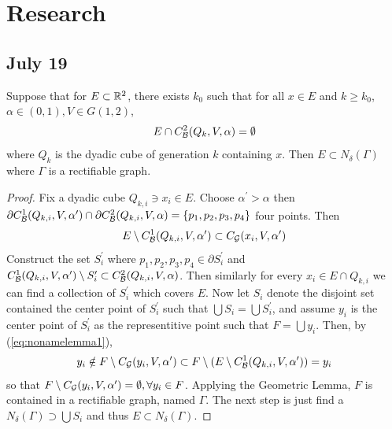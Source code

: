 \section{Research}


\subsection{July 19}
\begin{lemma}
    Suppose that for $E\subset \mathbb{R}^2$, there exists $k_0$ such that for all $x\in E$ and $k\geq k_0$, $\alpha\in(0,1), V\in G(1,2)$,
    \begin{equation*}
        E\cap C_\mathcal B^2(Q_k, V, \alpha) = \emptyset
    \end{equation*}
    where $Q_k$ is the dyadic cube of generation $k$ containing $x$. Then $E\subset N_\delta(\Gamma)$ where $\Gamma$ is a rectifiable graph. 
\end{lemma}
\begin{proof}
    Fix a dyadic cube $Q_{k,i}\ni x_i\in E$. Choose $\alpha^\prime>\alpha$ then $\partial C_\mathcal B^1(Q_{k,i}, V, \alpha^\prime) \cap \partial C_\mathcal B^2(Q_{k,i}, V, \alpha) = \{p_1, p_2, p_3, p_4\}$ four points. Then 
    \begin{equation}\label{eq:nonamelemma1}
        E\setminus C_\mathcal B^1(Q_{k,i}, V, \alpha^\prime)\subset C_\mathcal G(x_i, V, \alpha^\prime)
    \end{equation}
    Construct the set $S_i^\prime$ where $p_1, p_2, p_3, p_4\in \partial S_i^\prime$ and $C_\mathcal B^1(Q_{k,i}, V, \alpha^\prime)\setminus S_i^\prime \subset C_\mathcal B^2(Q_{k,i}, V, \alpha) $. Then similarly for every $x_i\in E\cap Q_{k,i}$ we can find a collection of $S_i^\prime$ which covers $E$. Now let $S_i$ denote the disjoint set contained the center point of $S_i^\prime$ such that $\bigcup S_i = \bigcup S_i^\prime$, and assume $y_i$ is the center point of $S_i^\prime$ as the representitive point such that $F = \bigcup y_i$. Then, by (\ref{eq:nonamelemma1}), 
    \begin{equation*}
        y_i\notin F\setminus C_\mathcal G(y_i, V, \alpha^\prime)\subset F\setminus( E\setminus C_\mathcal B^1(Q_{k,i}, V, \alpha^\prime)) = y_i
    \end{equation*}
    so that $F\setminus C_\mathcal G(y_i, V, \alpha^\prime) = \emptyset, \forall y_i\in F$. Applying the Geometric Lemma, $F$ is contained in a rectifiable graph, named $\Gamma$. The next step is just find a $N_\delta(\Gamma) \supset \bigcup S_i$ and thus $E\subset N_\delta(\Gamma)$.
\end{proof}



